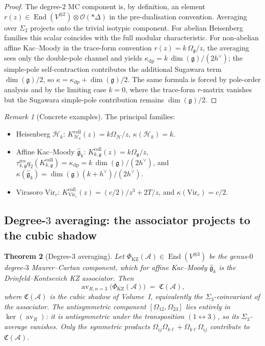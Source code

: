 \documentclass[11pt,reqno]{amsart}
\newtheorem{theorem}{Theorem}[section]
\theoremstyle{definition}
\theoremstyle{remark}
\newtheorem{remark}[theorem]{Remark}
\newcommand{\cA}{\mathcal{A}}
\newcommand{\cH}{\mathcal{H}}
\newcommand{\cO}{\mathcal{O}}
\DeclareMathOperator{\End}{End}
\DeclareMathOperator{\av}{av}
\newcommand{\fg}{\mathfrak{g}}
\newcommand{\Vir}{\mathrm{Vir}}
\numberwithin{equation}{section}
\begin{document}
\begin{proof}
The degree-$2$ MC component is, by definition, an element
$r(z) \in \End(V^{\otimes 2}) \otimes \cO(*\Delta)$ in the
pre-dualisation convention. Averaging over $\Sigma_2$ projects onto
the trivial isotypic component. For abelian Heisenberg families
this scalar coincides with the full modular characteristic. For
non-abelian affine Kac--Moody in the trace-form convention
$r(z) = k\,\Omega_\fg/z$, the averaging sees only the double-pole
channel and yields
$\kappa_{\mathrm{dp}} = k\,\dim(\fg)/(2h^\vee)$; the simple-pole
self-contraction contributes the additional Sugawara term
$\dim(\fg)/2$, so
$\kappa = \kappa_{\mathrm{dp}} + \dim(\fg)/2$.
The same formula is forced by pole-order analysis and by the limiting
case \(k=0\), where the trace-form \(r\)-matrix vanishes but the
Sugawara simple-pole contribution remains \( \dim(\fg)/2 \).
\end{proof}

\begin{remark}[Concrete examples]
\label{rem:concrete-r-kappa}
The principal families:
\begin{itemize}
\item Heisenberg $\cH_k$:
  $K_{\cH_k}^{\mathrm{coll}}(z)=k\Omega_{\mathcal H}/z$,
  $\kappa(\cH_k) = k$.

\item Affine Kac--Moody $\widehat{\fg}_k$:
  $K_{k,\fg}^{\mathrm{coll}}(z)=k\Omega_\fg/z$,
  $\tau_{k,\fg}^{\mathrm{res}}q_2(K_{k,\fg}^{\mathrm{coll}})
  = \kappa_{\mathrm{dp}}
  = k\,\dim(\fg)/(2h^\vee)$,
  and
  $\kappa(\widehat{\fg}_k)
  = \dim(\fg)(k+h^\vee)/(2h^\vee)$.

\item Virasoro $\Vir_c$:
  $K_{\Vir_c}^{\mathrm{coll}}(z)=(c/2)/z^3+2T/z$,
  and $\kappa(\Vir_c) = c/2$.
\end{itemize}
\end{remark}

\subsection{Degree-$3$ averaging: the associator projects to the
cubic shadow}

\begin{theorem}[Degree-$3$ averaging]
\label{thm:degree-3-av}
Let $\Phi_{\mathrm{KZ}}(\cA) \in \End(V^{\otimes 3})$ be the
genus-$0$ degree-$3$ Maurer--Cartan component, which for affine
Kac--Moody $\widehat{\fg}_k$ is the Drinfeld--Kontsevich KZ
associator. Then
\begin{equation}\label{eq:degree-3-av}
\av_{R,n=3}\bigl(\Phi_{\mathrm{KZ}}(\cA)\bigr)
  \;=\; \mathfrak{C}(\cA),
\end{equation}
where $\mathfrak{C}(\cA)$ is the cubic shadow of Volume~I,
equivalently the $\Sigma_3$-coinvariant of the associator. The
antisymmetric component $[\Omega_{12}, \Omega_{23}]$ lies entirely
in $\ker(\av_R)$: it is antisymmetric under the transposition
$(1 \leftrightarrow 3)$, so its $\Sigma_3$-average vanishes. Only
the symmetric products
$\Omega_{ij}\Omega_{k\ell} + \Omega_{k\ell}\Omega_{ij}$ contribute
to~$\mathfrak{C}(\cA)$.
\end{theorem}
\end{document}
